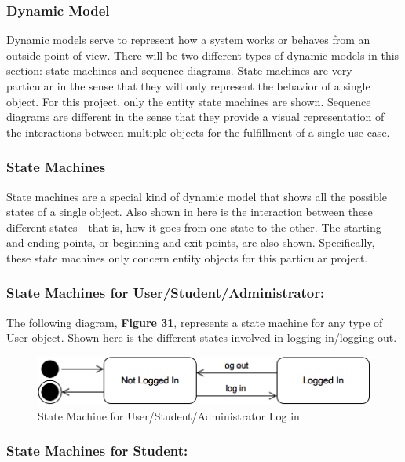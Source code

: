\documentclass[12pt,letterpaper]{article}
\begin{document}
\subsubsection{Dynamic Model}

Dynamic models serve to represent how a system works or behaves from an outside point-of-view. There will be two different types of dynamic
models in this section: state machines and sequence diagrams. State machines are very particular in the sense that they will only represent the 
behavior of a single object. For this project, only the entity state machines are shown. Sequence diagrams are different in the sense that they
provide a visual representation of the interactions between multiple objects for the fulfillment of a single use case.

\subsubsection*{State Machines}

State machines are a special kind of dynamic model that shows all the possible states of a single object. Also shown in here is the interaction between these 
different states - that is, how it goes from one state to the other. The starting and ending points, or beginning and exit points, are also shown. Specifically, these state
machines only concern entity objects for this particular project.

\subsubsection*{State Machines for User/Student/Administrator:}

The following diagram, {\bf Figure 31}, represents a state machine for any type of User object. Shown here is the different states involved in logging in/logging out.

\begin{figure}[H]
	\centering{}
	\includegraphics[scale=0.3]{imgs/state/user-log-in.png}
	\caption{State Machine for User/Student/Administrator Log in}
\end{figure}

\subsubsection*{State Machines for Student:}
\end{document}
